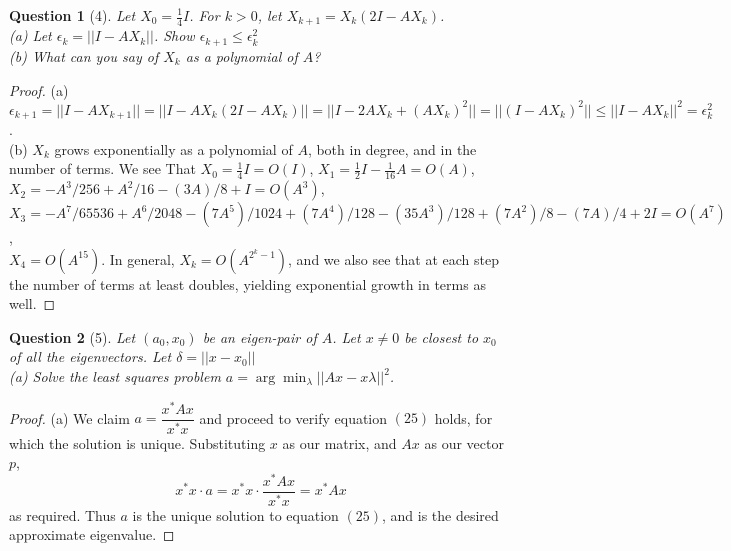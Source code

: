 \documentclass[11pt]{article}
\theoremstyle{quest}
\newtheorem*{question}{Question}
\begin{document}
\begin{question}[4]
Let $X_0 = \frac{1}{4}I$. For $k > 0$, let $X_{k+1} = X_k(2I - AX_k)$.
\\(a) Let $\epsilon_k = ||I - AX_k||$. Show $\epsilon_{k+1} \le \epsilon_k^2$
\\(b) What can you say of $X_k$ as a polynomial of $A$?
\end{question}
\begin{proof}
(a) $\epsilon_{k+1} = ||I - AX_{k+1}|| = ||I - AX_k(2I-AX_k)|| = ||I - 2AX_k + (AX_k)^2|| = ||(I - AX_k)^2|| \le ||I - AX_k||^2 = \epsilon_k^2$.
\\(b) $X_k$ grows exponentially as a polynomial of $A$, both in degree, and in the number of terms. We see That $X_0 = \frac{1}{4}I = O(I)$, $X_1 = \frac{1}{2}I - \frac{1}{16}A = O(A)$, \\$X_2 = -A^3/256 + A^2/16 - (3 A)/8 + I = O(A^3)$, \\$X_3 = -A^7/65536 + A^6/2048 - (7 A^5)/1024 + (7 A^4)/128 - (35 A^3)/128 + (7 A^2)/8 - (7 A)/4 + 2I = O(A^7)$, \\$X_4 = O(A^{15})$. In general, $X_k = O(A^{2^k-1})$, and we also see that at each step the number of terms at least doubles, yielding exponential growth in terms as well.
\end{proof}
\begin{question}[5]
Let $(a_0, x_0)$ be an eigen-pair of $A$. Let $x \ne 0$ be closest to $x_0$ of all the eigenvectors. Let $\delta = ||x - x_0||$
\\(a) Solve the least squares problem $a = \arg\min_\lambda ||Ax - x
\lambda||^2$.
\end{question}
\begin{proof}
(a) We claim $a = \dfrac{x^*Ax}{x^*x}$ and proceed to verify equation $(25)$ holds, for which the solution is unique. Substituting $x$ as our matrix, and $Ax$ as our vector $p$,
$$x^*x \cdot a = x^*x \cdot \dfrac{x^*Ax}{x^*x} = x^*Ax$$
as required. Thus $a$ is the unique solution to equation $(25)$, and is the desired approximate eigenvalue.
\end{proof}
\end{document}

